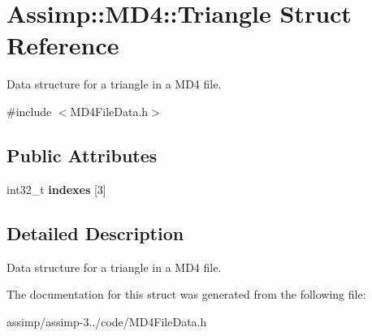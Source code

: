 \hypertarget{struct_assimp_1_1_m_d4_1_1_triangle}{\section{Assimp\+:\+:M\+D4\+:\+:Triangle Struct Reference}
\label{struct_assimp_1_1_m_d4_1_1_triangle}
}


Data structure for a triangle in a M\+D4 file.  




{\ttfamily \#include $<$M\+D4\+File\+Data.\+h$>$}

\subsection*{Public Attributes}
\begin{DoxyCompactItemize}
\item 
\hypertarget{struct_assimp_1_1_m_d4_1_1_triangle_a2fd15cdce2f52ad7903344c27e5eb3b9}{int32\+\_\+t {\bfseries indexes} \mbox{[}3\mbox{]}}\label{struct_assimp_1_1_m_d4_1_1_triangle_a2fd15cdce2f52ad7903344c27e5eb3b9}

\end{DoxyCompactItemize}


\subsection{Detailed Description}
Data structure for a triangle in a M\+D4 file. 

The documentation for this struct was generated from the following file\+:\begin{DoxyCompactItemize}
\item 
assimp/assimp-\/3../code/M\+D4\+File\+Data.\+h\end{DoxyCompactItemize}
